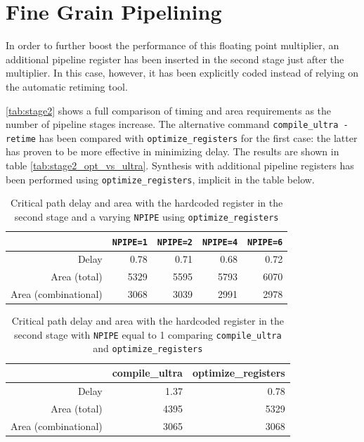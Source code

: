 \section{Fine Grain Pipelining}
In order to further boost the performance of this floating point multiplier, an additional pipeline register has been inserted in the second stage just after the multiplier. In this case, however, it has been explicitly coded instead of relying on the automatic retiming tool.

\autoref{tab:stage2} shows a full comparison of timing and area requirements as the number of pipeline stages increase. The alternative command \texttt{compile\_ultra -retime} has been compared with \texttt{optimize\_registers} for the first case: the latter has proven to be more effective in minimizing delay. The results are shown in table \autoref{tab:stage2_opt_vs_ultra}. Synthesis with additional pipeline registers has been performed using \texttt{optimize\_registers}, implicit in the table below.

\begin{table}[htbp]
    \centering
	\begin{tabular}{|r|r|r|r|r|}
	\hline
	                       &\texttt{NPIPE=1} & \texttt{NPIPE=2} & \texttt{NPIPE=4} & \texttt{NPIPE=6}\\\hline
	Delay                   & 0.78             & 0.71             & 0.68             & 0.72 \\\hline
    Area (total)           & 5329             & 5595             & 5793             & 6070 \\\hline
    Area (combinational)   & 3068             & 3039             & 2991             & 2978 \\\hline
	\end{tabular}
	\caption{Critical path delay and area with the hardcoded register in the second stage and a varying \texttt{NPIPE} using \texttt{optimize\_registers}}
	\label{tab:stage2}
\end{table}

\begin{table}[htbp]
	\centering
	\begin{tabular}{|r|r|r|}
		\hline
		& compile\_ultra 	& optimize\_registers \\\hline
		Delay            		& 1.37				& 0.78  \\\hline
		Area (total)        	& 4395 				& 5329   \\\hline
		Area (combinational)	& 3065 				& 3068   \\\hline
	\end{tabular}
	\caption{Critical path delay and area with the hardcoded register in the second stage with \texttt{NPIPE} equal to 1 comparing \texttt{compile\_ultra} and \texttt{optimize\_registers}}
	\label{tab:stage2_opt_vs_ultra}
\end{table}


